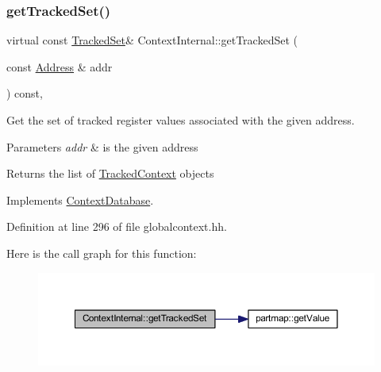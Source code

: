 \subsubsection{\texorpdfstring{getTrackedSet()}{getTrackedSet()}}
{\footnotesize\ttfamily virtual const \mbox{\hyperlink{globalcontext_8hh_a7559d2c55c5d12fbbaf0418733b62438}{Tracked\+Set}}\& Context\+Internal\+::get\+Tracked\+Set (\begin{DoxyParamCaption}\item[{const \mbox{\hyperlink{class_address}{Address}} \&}]{addr }\end{DoxyParamCaption}) const\hspace{0.3cm}{\ttfamily [inline]}, {\ttfamily [virtual]}}



Get the set of tracked register values associated with the given address. 


\begin{DoxyParams}{Parameters}
{\em addr} & is the given address \\
\hline
\end{DoxyParams}
\begin{DoxyReturn}{Returns}
the list of \mbox{\hyperlink{struct_tracked_context}{Tracked\+Context}} objects 
\end{DoxyReturn}


Implements \mbox{\hyperlink{class_context_database_a6ea1e4b793286c0b1ecbafcc58422339}{Context\+Database}}.



Definition at line 296 of file globalcontext.\+hh.

Here is the call graph for this function\+:
\nopagebreak
\begin{figure}[H]
\begin{center}
\leavevmode
\includegraphics[width=350pt]{class_context_internal_a0953f0bba2a187d4cd001463c9f667ab_cgraph}
\end{center}
\end{figure}
\mbox{\label{class_context_internal_ad4674e15208ed415b717d058edc1a140}} 
